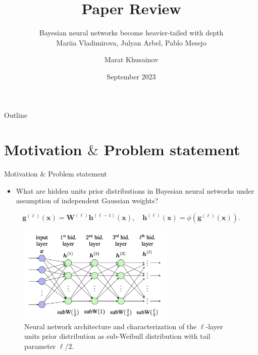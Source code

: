 \documentclass[10pt, handout, envcountsect]{beamer} %
\title[Paper Review]{Paper Review}
\subtitle{
\large{Bayesian neural networks become heavier-tailed with depth}
\\
\vspace{3pt}
\normalsize{Mariia Vladimirova, Julyan Arbel, Pablo Mesejo}
}
\author{Marat Khusainov}
\date{September 2023}
\begin{document}
\maketitle


\begin{frame}{Outline}

\tableofcontents

\end{frame}

\section{Motivation $\&$ Problem statement}

\begin{frame}{Motivation $\&$ Problem statement}
\begin{itemize}
    \item What are hidden units prior distributions in Bayesian neural networks under assumption of independent Gaussian weights?
\end{itemize}

$$
\boldsymbol{g}^{(\ell)}(\boldsymbol{x})=\boldsymbol{W}^{(\ell)} \boldsymbol{h}^{(\ell-1)}(\boldsymbol{x}), \quad \boldsymbol{h}^{(\ell)}(\boldsymbol{x})=\phi\left(\boldsymbol{g}^{(\ell)}(\boldsymbol{x})\right).
$$

\begin{figure}[h]
    \centering
    \includegraphics[width=7.5cm,]{figure_2.png}
    \caption{Neural network architecture and characterization of the $\ell$-layer units prior distribution as sub-Weibull distribution with tail parameter $\ell/2$.}
\end{figure} 
    
\end{frame}
\end{document}
